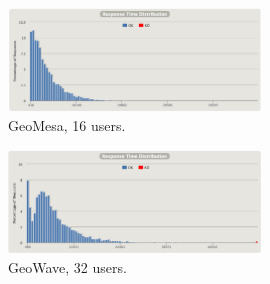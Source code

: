 \begin{figure}[h!tb]
  \centering
  \includegraphics[width=0.60\textwidth]{../docs/img/multitenancy/gm-16-responses.png}
  \caption{GeoMesa, 16 users.}
  \label{geomesa16}
\end{figure}

\begin{figure}[h!tb]
  \centering
  \includegraphics[width=0.60\textwidth]{../docs/img/multitenancy/gm-32-responses.png}
  \caption{GeoWave, 32 users.}
  \label{geomesa32}
\end{figure}
